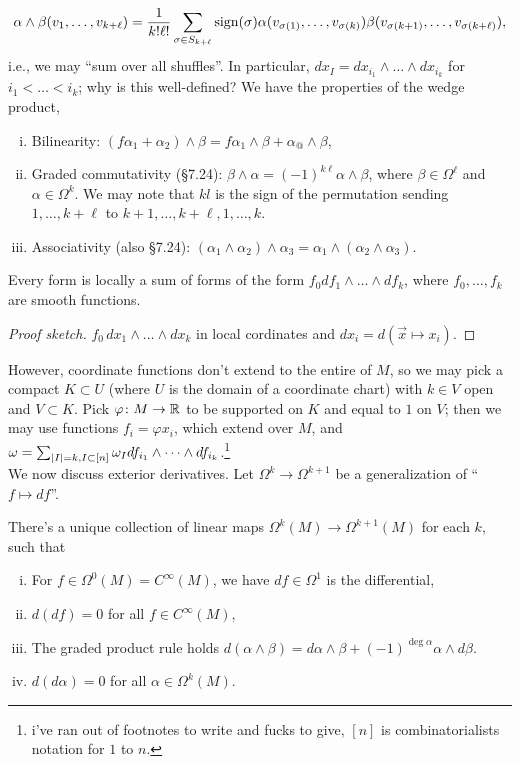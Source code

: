\[ \alpha \wedge \beta(v_1, \dots, v_{k+\ell}) = \frac{1}{k! \ell!} \sum_{\sigma \in S_{k+\ell}} \mathrm{\operatorname{sign}}(\sigma) \alpha(v_{\sigma(1)}, \dots, v_{\sigma(k)}) \beta(v_{\sigma(k+1)}, \dots, v_{\sigma(k+\ell)}), \]
i.e., we may ``sum over all shuffles''. In particular, $dx_I = dx_{i_1} \wedge \dots \wedge dx_{i_k}$ for $i_1 < \dots < i_k$; why is this well-defined? We have the properties of the wedge product,
\begin{enumerate}[(i)]
    \item Bilinearity: $(f \alpha_1 + \alpha_2) \wedge \beta = f \alpha_1 \wedge \beta + \alpha_@ \wedge \beta$,
    \item Graded commutativity (\S7.24): $\beta \wedge \alpha = (-1)^{k\ell} \alpha \wedge \beta$, where $\beta \in \Omega^\ell$ and $\alpha \in \Omega^k$. We may note that $kl$ is the sign of the permutation sending $1, \dots, k+\ell$ to $k+1, \dots, k+\ell, 1, \dots, k$.
    \item Associativity (also \S7.24): $(\alpha_1 \wedge \alpha_2) \wedge \alpha_3 = \alpha_1 \wedge (\alpha_2 \wedge \alpha_3)$. 
\end{enumerate}
\begin{corollary}[\S7.21]
    Every form is locally a sum of forms of the form $f_0 df_1 \wedge \dots \wedge df_k$, where $f_0, \dots, f_k$ are smooth functions.
\end{corollary}
\begin{proof}[Proof sketch]
    $f_0 \, dx_1 \wedge \dots \wedge dx_k$ in local cordinates and $dx_i = d(\vec{x} \mapsto x_i)$.
\end{proof}
However, coordinate functions don't extend to the entire of $M$, so we may pick a compact $K \subset U$ (where $U$ is the domain of a coordinate chart) with $k \in V$ open and $V \subset K$. Pick $\varphi \colon M \to \mathbb R$ to be supported on $K$ and equal to $1$ on $V$; then we may use functions $f_i = \varphi x_i$, which extend over $M$, and $\omega = \sum_{\left\lvert I \right\rvert = k, I \subset [n]} \omega_I df_{i_1} \wedge \dots \wedge df_{i_k}$.\footnote{i've ran out of footnotes to write and fucks to give, $[n]$ is combinatorialists notation for $1$ to $n$.}
\\[8pt]
We now discuss exterior derivatives. Let $\Omega^k \to \Omega^{k+1}$ be a generalization of ``$f \mapsto df$''.
\begin{definition}[\S7.25]
    There's a unique collection of linear maps $\Omega^k(M) \to \Omega^{k+1}(M)$ for each $k$, such that
    \begin{enumerate}[(i)]
        \item For $f \in \Omega^0(M) = C^\infty(M)$, we have $df \in \Omega^1$ is the differential,
        \item $d(df) = 0$ for all $f \in C^\infty(M)$,
        \item The graded product rule holds $d(\alpha \wedge \beta) = d \alpha \wedge \beta + (-1)^{\deg \alpha} \alpha \wedge d\beta$.
        \item $d(d\alpha) = 0$ for all $\alpha \in \Omega^k(M)$.
    \end{enumerate}
\end{definition}

